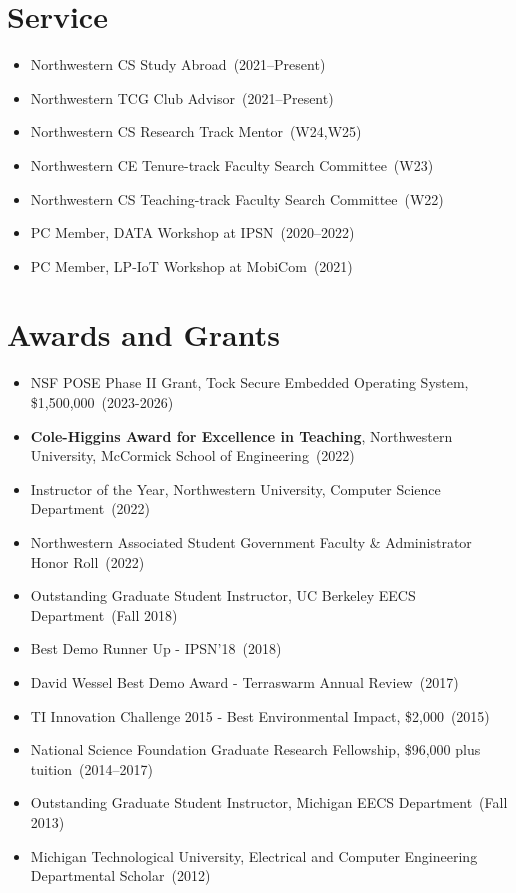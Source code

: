 \documentclass{article}
\begin{document}

\section*{Service}
\vspace{-6pt}
\begin{itemize}
  \item[] Northwestern CS Study Abroad~(2021--Present)
  \item[] Northwestern TCG Club Advisor~(2021--Present)
  \item[] Northwestern CS Research Track Mentor~(W24,W25)
  \item[] Northwestern CE Tenure-track Faculty Search Committee~(W23)
  \item[] Northwestern CS Teaching-track Faculty Search Committee~(W22)
  \item[] PC Member, DATA Workshop at IPSN~(2020--2022)
  \item[] PC Member, LP-IoT Workshop at MobiCom~(2021)
\end{itemize}

\section*{Awards and Grants}
\vspace{-6pt}
\begin{itemize}
  \item[] NSF POSE Phase II Grant, Tock Secure Embedded Operating System, \$1,500,000~(2023-2026)
  \item[] \textbf{Cole-Higgins Award for Excellence in Teaching}, Northwestern University, McCormick School of Engineering~(2022)
  \item[] Instructor of the Year, Northwestern University, Computer Science Department~(2022)
  \item[] Northwestern Associated Student Government Faculty \& Administrator Honor Roll~(2022)
  \item[] Outstanding Graduate Student Instructor, UC Berkeley EECS Department~(Fall 2018)
  \item[] Best Demo Runner Up - IPSN'18~(2018)
  \item[] David Wessel Best Demo Award - Terraswarm Annual Review~(2017)
  \item[] TI Innovation Challenge 2015 - Best Environmental Impact, \$2,000~(2015)
  \item[] National Science Foundation Graduate Research Fellowship, \$96,000 plus tuition~(2014--2017)
  \item[] Outstanding Graduate Student Instructor, Michigan EECS Department~(Fall 2013)
  \item[] Michigan Technological University, Electrical and Computer Engineering Departmental Scholar~(2012)
\end{itemize}
\end{document}
